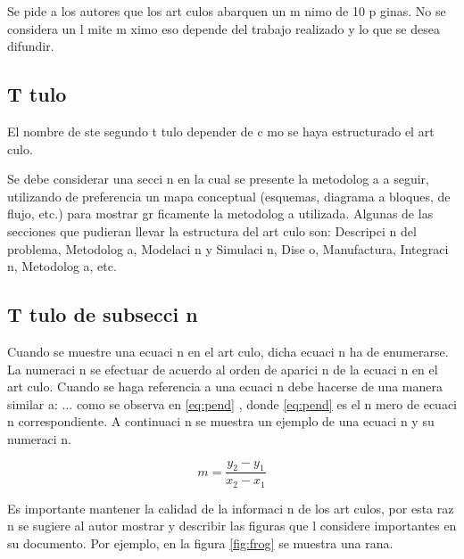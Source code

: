\documentclass{article}
\begin{document}
    Se pide a los autores que los art culos abarquen un m nimo de 10 p ginas. No se considera un l mite m ximo eso depende del trabajo realizado y lo que se desea difundir.



\newpage %
\vspace{0.5cm}
\begin{center}
    \section{T tulo}
\end{center}

    El nombre de  ste segundo t tulo depender  de c mo se haya estructurado el art culo.
    
    Se debe considerar una secci n en la cual se presente la metodolog a a seguir, utilizando de preferencia un mapa conceptual (esquemas, diagrama a bloques, de flujo, etc.) para mostrar gr ficamente la metodolog a utilizada. Algunas de las secciones que pudieran llevar la estructura del art culo son: Descripci n del problema, Metodolog a, Modelaci n y Simulaci n, Dise o, Manufactura, Integraci n, Metodolog a, etc.

    \subsection{T tulo de subsecci n}

        Cuando se muestre una ecuaci n en el art culo, dicha ecuaci n ha de enumerarse. La numeraci n se efectuar  de acuerdo al orden de aparici n de la ecuaci n en el art culo. Cuando se haga referencia a una ecuaci n debe hacerse de una manera similar a:  ... como se observa en \ref{eq:pend} , donde \ref{eq:pend} es el n mero de ecuaci n correspondiente. A continuaci n se muestra un ejemplo de una ecuaci n y su numeraci n.

        \vspace{0.5cm}
        \begin{equation}
            m=\frac{y_2-y_1}{x_2-x_1}
            \label{eq:pend}
        \end{equation}
        \vspace{0.5cm}

        Es importante mantener la calidad de la informaci n de los art culos, por esta raz n se sugiere al autor mostrar y describir las figuras que  l considere importantes en su documento. Por ejemplo, en la figura \ref{fig:frog} se muestra una rana.
\end{document}
